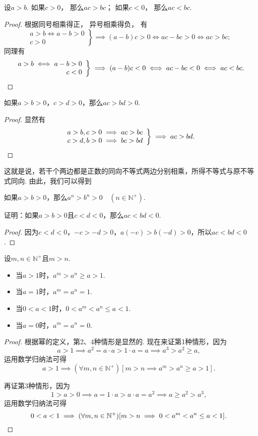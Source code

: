 \begin{theorem}
设\(a>b\).
如果\(c>0\)，
那么\(ac>bc\)；
如果\(c<0\)，
那么\(ac<bc\).
\begin{proof}
根据同号相乘得正，
异号相乘得负，
有\[
	\left. \begin{array}{r}
		a>b \iff a-b>0 \\
		c>0
	\end{array} \right\}
	\implies (a-b)c>0
	\iff ac-bc>0
	\iff ac>bc;
\]
同理有\[
	\left. \begin{array}{r}
		a>b \iff a-b> 0 \\
		c<0
	\end{array} \right\}
	\implies (a-b)c<0
	\iff ac-bc<0
	\iff ac<bc.
	\qedhere
\]
\end{proof}
\end{theorem}

\begin{corollary}
如果\(a>b>0\)，\(c>d>0\)，那么\(ac>bd>0\).
\begin{proof}
显然有\[
\left. \begin{array}{r}
a>b,c>0 \implies ac>bc \\
c>d,b>0 \implies bc>bd
\end{array} \right\}
\implies ac>bd.
\qedhere
\]
\end{proof}
\end{corollary}
这就是说，若干个两边都是正数的同向不等式两边分别相乘，所得不等式与原不等式同向.
由此，我们可以得到
\begin{corollary}
如果\(a>b>0\)，那么\(a^n>b^n>0 \quad (n\in\mathbb{N}^+)\).
\end{corollary}

\begin{example}
证明：如果\(a > b > 0\)且\(c < d < 0\)，那么\(ac < bd < 0\).
\begin{proof}
因为\(c < d < 0\)，\(-c > -d > 0\)，\(a(-c) > b(-d) > 0\)，所以\(ac < bd < 0\).
\end{proof}
\end{example}

\begin{corollary}\label{theorem:不等式.正整数次幂的序}
设\(m,n\in\mathbb{N}^+\)且\(m>n\).
\begin{itemize}
	\item 当\(a>1\)时，\(a^m > a^n \geq a > 1\).
	\item 当\(a=1\)时，\(a^m = a^n = 1\).
	\item 当\(0<a<1\)时，\(0 < a^m < a^n \leq a < 1\).
	\item 当\(a=0\)时，\(a^m = a^n = 0\).
\end{itemize}
\begin{proof}
根据幂的定义，第2、4种情形是显然的.
现在来证第1种情形，因为\[
	a > 1
	\implies
	a^2 = a \cdot a > 1 \cdot a = a
	\implies
	a^3 > a^2 \geq a,
\]
运用数学归纳法可得\[
	a>1
	\implies
	(\forall m,n\in\mathbb{N}^+)
	[m>n \implies a^m > a^n \geq a > 1].
\]

再证第3种情形，因为\[
	1>a>0
	\implies
	a = 1 \cdot a > a \cdot a = a^2
	\implies
	a \geq a^2 > a^3,
\]
运用数学归纳法可得\[
	0<a<1
	\implies
	(\forall m,n\in\mathbb{N}^+)
	[m>n \implies 0 < a^m < a^n \leq a < 1].
	\qedhere
\]
\end{proof}
\end{corollary}


